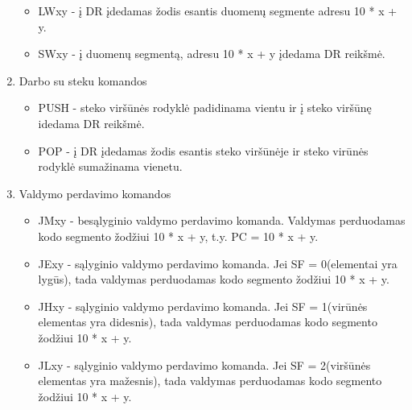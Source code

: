 \begin{enumerate}
\begin{itemize}
		\item LWxy - į DR įdedamas žodis esantis duomenų segmente adresu 10 * x + y.
		\item SWxy - į duomenų segmentą, adresu 10 * x + y įdedama DR reikšmė.
		\end{itemize}
	\item Darbo su steku komandos
		\begin{itemize}
		\item PUSH - steko viršūnės rodyklė padidinama vientu ir į steko viršūnę idedama DR reikšmė.
		\item POP - į DR įdedamas žodis esantis steko viršūnėje ir steko virūnės rodyklė sumažinama vienetu.
		\end{itemize}
	\item Valdymo perdavimo komandos
		\begin{itemize}
		\item JMxy - besąlyginio valdymo perdavimo komanda. Valdymas perduodamas kodo segmento žodžiui 10 * x + y, t.y. PC = 10 * x + y.
		\item JExy - sąlyginio valdymo perdavimo komanda. Jei SF = 0(elementai yra lygūs), tada valdymas perduodamas kodo segmento žodžiui 10 * x + y.
		\item JHxy - sąlyginio valdymo perdavimo komanda. Jei SF = 1(virūnės elementas yra didesnis), tada valdymas perduodamas kodo segmento žodžiui 10 * x + y.
		\item JLxy  - sąlyginio valdymo perdavimo komanda. Jei SF = 2(viršūnės elementas yra mažesnis), tada valdymas perduodamas kodo segmento žodžiui 10 * x + y.
		\end{itemize}
	\end{enumerate}